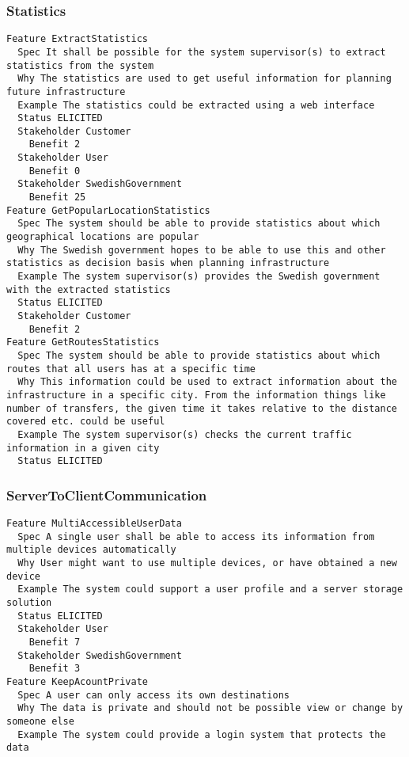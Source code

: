 \begin{lstlisting}

\end{lstlisting}


       \subsubsection{Statistics}


\begin{lstlisting}
Feature ExtractStatistics
  Spec It shall be possible for the system supervisor(s) to extract statistics from the system
  Why The statistics are used to get useful information for planning future infrastructure
  Example The statistics could be extracted using a web interface
  Status ELICITED
  Stakeholder Customer
    Benefit 2
  Stakeholder User
    Benefit 0
  Stakeholder SwedishGovernment
    Benefit 25
Feature GetPopularLocationStatistics
  Spec The system should be able to provide statistics about which geographical locations are popular
  Why The Swedish government hopes to be able to use this and other statistics as decision basis when planning infrastructure
  Example The system supervisor(s) provides the Swedish government with the extracted statistics
  Status ELICITED
  Stakeholder Customer
    Benefit 2
Feature GetRoutesStatistics
  Spec The system should be able to provide statistics about which routes that all users has at a specific time
  Why This information could be used to extract information about the infrastructure in a specific city. From the information things like number of transfers, the given time it takes relative to the distance covered etc. could be useful
  Example The system supervisor(s) checks the current traffic information in a given city
  Status ELICITED

\end{lstlisting}
    
        
       \subsubsection{ServerToClientCommunication}


\begin{lstlisting}
Feature MultiAccessibleUserData
  Spec A single user shall be able to access its information from multiple devices automatically
  Why User might want to use multiple devices, or have obtained a new device
  Example The system could support a user profile and a server storage solution
  Status ELICITED
  Stakeholder User
    Benefit 7
  Stakeholder SwedishGovernment
    Benefit 3
Feature KeepAcountPrivate
  Spec A user can only access its own destinations
  Why The data is private and should not be possible view or change by someone else
  Example The system could provide a login system that protects the data

\end{lstlisting}
    

